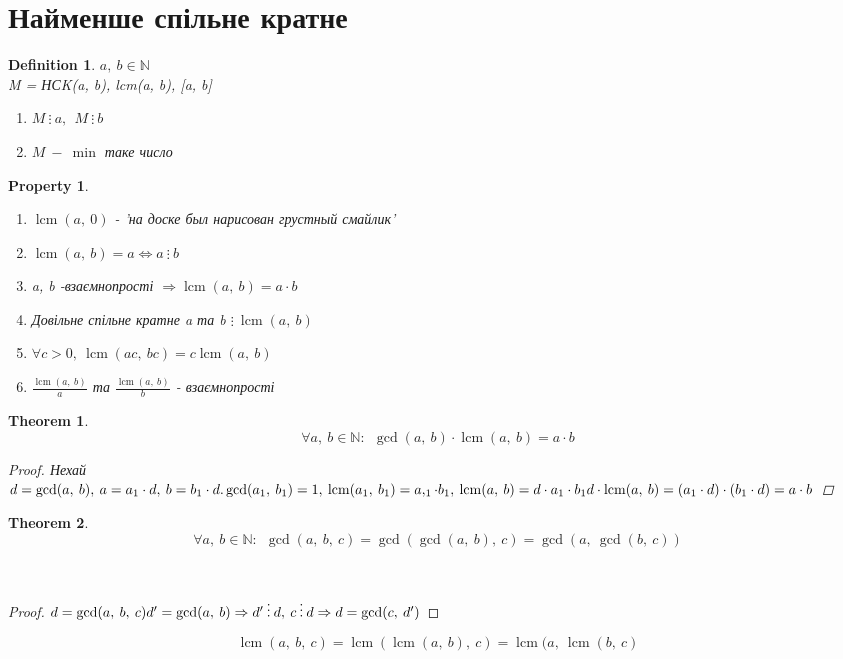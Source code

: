 \documentclass[a4paper,12pt, centered]{bookest}
\newtheorem{theorem}{Theorem}[section]
\newtheorem{definition}{Definition}[section]
\newtheorem*{property*}{Property}
\DeclareMathOperator{\lcm}{lcm}
\begin{document}
\section{Найменше спільне кратне}
\begin{definition}

$a,\>b\in\mathbb{N}$\\
M = НСK(a, b), lcm(a, b), [a, b]
\begin{enumerate}
	\item $M\>\vdots\>a,\>\>M\>\vdots\>b$
	\item $M\>-\>\min$ таке число
\end{enumerate}
\end{definition}
\begin{property*}$ $
	\begin{enumerate}
		\item $\lcm(a,\>0)$ - 'на доске был нарисован грустный смайлик'
		\item $\lcm(a,\>b) = a\Leftrightarrow a\>\vdots\>b$
		\item a, b -взаємнопрості $\Rightarrow\lcm(a,\>b)=a\cdot b$
		\item Довільне спільне кратне a та b $\vdots\>\lcm(a,\>b)$
		\item $\forall c>0,\>\lcm(ac,\>bc)=c\lcm(a,\>b)$
		\item $\frac{\lcm(a,\>b)}{a}$ та $\frac{\lcm(a,\>b)}{b}$ - взаємнопрості
	\end{enumerate}
\end{property*}
\begin{theorem}
	$$\forall a,\>b\in\mathbb{N}:\>\>\gcd(a,\>b)\cdot\lcm(a,\>b)=a\cdot b$$
	\begin{proof}
		Нехай $d=\gcd(a,\>b),\>a=a_1\cdot d,\>b=b_1\cdot d.\\\gcd(a_1,\>b_1)=1,\>\lcm(a_1,\>b_1)=a,_1\cdot b_1,\>\lcm(a,\>b)=d\cdot a_1\cdot b_1\\ d\cdot\lcm(a,\>b)=(a_1\cdot d)\cdot(b_1\cdot d)=a\cdot b$
	\end{proof}
\end{theorem}
\begin{theorem}
	$$\forall a,\>b\in\mathbb{N}:\>\>\gcd(a,\>b,\>c)=\gcd(\gcd(a,\>b),\>c)=\gcd(a,\>\gcd(b,\>c))$$
\end{theorem}$ $
	\begin{proof}
		$d=\gcd(a,\>b,\>c)\\d'=\gcd(a,\>b)\Rightarrow d'\>\vdots\>d,\>c\>\vdots\>d\Rightarrow d=\gcd(c,\>d')$
	\end{proof}
$$\lcm(a,\>b,\>c)=\lcm(\lcm(a,\>b),\>c)=\lcm(a,\>\lcm(b,\>c)$$
\end{document}

